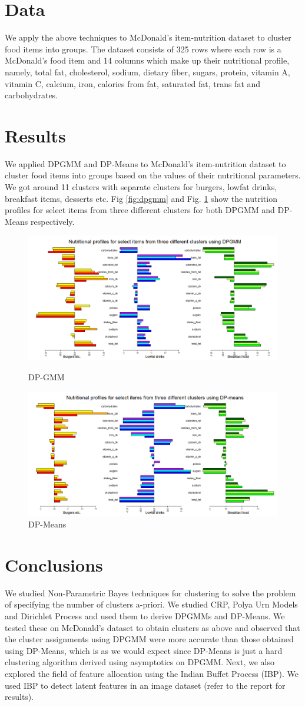 \documentclass{article} %
\begin{document}
\section{Data}
We apply the above techniques to McDonald's item-nutrition dataset to cluster food items into groups. The dataset consists of 325 rows where each row is a McDonald's food item and 14 columns which make up their nutritional profile, namely, total fat, cholesterol, sodium, dietary fiber, sugars, protein, vitamin A, vitamin C, calcium, iron, calories from fat, saturated fat, trans fat and carbohydrates.

\section{Results}
We applied DPGMM and DP-Means to McDonald’s item-nutrition dataset to cluster food items into groups based on the values of their nutritional parameters. We got around 11 clusters with separate clusters for burgers, lowfat drinks, breakfast items, desserts etc. Fig \ref{fig:dpgmm} and Fig. \ref{fig:dpmeans} show the nutrition profiles for select items from three different clusters for both DPGMM and DP-Means respectively.

\begin{figure}
  \centering
  \includegraphics[width=.6\linewidth]{plots/dpgmm.png}
  \caption{DP-GMM}
  \label{fig:dpgmm}
  \includegraphics[width=.6\linewidth]{plots/dpmeans.png}
  \caption{DP-Means}
  \label{fig:dpmeans}
\end{figure}


\section{Conclusions}
We studied Non-Parametric Bayes techniques for clustering to solve the problem of specifying the number of clusters a-priori. We studied CRP, Polya Urn Models and Dirichlet Process and used them to derive DPGMMs and DP-Means. We tested these on McDonald’s dataset to obtain clusters as above and observed that the cluster assignments using DPGMM were more accurate than those obtained using DP-Means, which is as we would expect since DP-Means is just a hard clustering algorithm derived using asymptotics on DPGMM.
Next, we also explored the field of feature allocation using the Indian Buffet Process (IBP). We used IBP to detect latent features in an image dataset (refer to the report for results).
\end{document}
